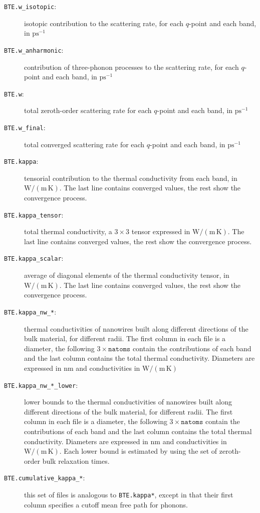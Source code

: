 \documentclass[a4paper,10pt,english]{article}
\begin{document}
\begin{description}
\item[\texttt{BTE.w\_isotopic}:] isotopic contribution to the scattering rate, for each $q$-point and each band, in $\mathrm{ps^{-1}}$
\item[\texttt{BTE.w\_anharmonic}:] contribution of three-phonon processes to the scattering rate, for each $q$-point and each band, in $\mathrm{ps^{-1}}$
\item[\texttt{BTE.w}:] total zeroth-order scattering rate for each $q$-point and each band, in $\mathrm{ps^{-1}}$
\item[\texttt{BTE.w\_final}:] total converged scattering rate for each $q$-point and each band, in $\mathrm{ps^{-1}}$
\item[\texttt{BTE.kappa}:] tensorial contribution to the thermal conductivity from each band, in $\mathrm{W/\left(m\,K\right)}$. The last line contains converged values, the rest show the convergence process.
\item[\texttt{BTE.kappa\_tensor}:] total thermal conductivity, a $3\times 3$ tensor expressed in $\mathrm{W/\left(m\,K\right)}$. The last line contains converged values, the rest show the convergence process.
\item[\texttt{BTE.kappa\_scalar}:] average of diagonal elements of the thermal conductivity tensor, in $\mathrm{W/\left(m\,K\right)}$. The last line contains converged values, the rest show the convergence process.
\item[\texttt{BTE.kappa\_nw\_*}:] thermal conductivities of nanowires built along different directions of the bulk material, for different radii. The first column in each file is a diameter, the following $3\times\mathtt{natoms}$ contain the contributions of each band and the last column contains the total thermal conductivity. Diameters are expressed in $\mathrm{nm}$ and conductivities in $\mathrm{W/\left(m\,K\right)}$
\item[\texttt{BTE.kappa\_nw\_*\_lower}:] lower bounds to the thermal conductivities of nanowires built along different directions of the bulk material, for different radii. The first column in each file is a diameter, the following $3\times\mathtt{natoms}$ contain the contributions of each band and the last column contains the total thermal conductivity. Diameters are expressed in $\mathrm{nm}$ and conductivities in $\mathrm{W/\left(m\,K\right)}$. Each lower bound is estimated by using the set of zeroth-order bulk relaxation times.
\item[\texttt{BTE.cumulative\_kappa\_*}:] this set of files is analogous to \texttt{BTE.kappa*}, except in that their first column specifies a cutoff mean free path for phonons.
\end{description}
\end{document}
